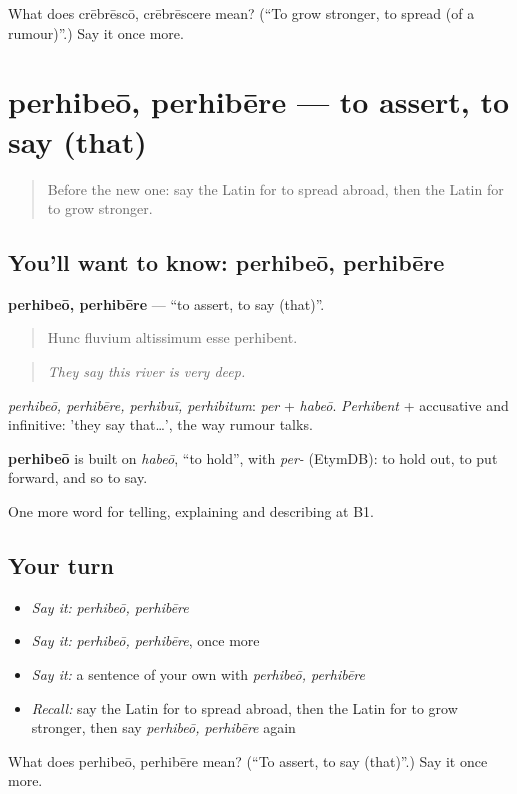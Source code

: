 \begin{tcolorbox}[breakable,colback=teal!4,colframe=teal!35!black,title={Before you move on}]
What does crēbrēscō, crēbrēscere mean? (\textquotedblleft{}To grow stronger, to spread (of a rumour)\textquotedblright{}.) Say it once more.
\end{tcolorbox}
\section[perhibeō, perhibēre]{perhibeō, perhibēre — to assert, to say (that)}

\label{lesson:LA-C301-perhibeo}



\begin{quote}
Before the new one: say the Latin for to spread abroad, then the Latin for to grow stronger.
\end{quote}

\subsection*{You'll want to know: perhibeō, perhibēre}
\textbf{perhibeō, perhibēre} — \textquotedblleft{}to assert, to say (that)\textquotedblright{}.

\begin{quote}
Hunc fluvium altissimum esse perhibent.
\end{quote}

\begin{quote}
\emph{They say this river is very deep.}
\end{quote}

\emph{perhibeō, perhibēre, perhibuī, perhibitum}: \emph{per} + \emph{habeō}. \emph{Perhibent} + accusative and infinitive: 'they say that…', the way rumour talks.

\begin{cousinweb}
\textbf{perhibeō} is built on \emph{habeō}, \textquotedblleft{}to hold\textquotedblright{}, with \emph{per-} (EtymDB): to hold out, to put forward, and so to say.
\end{cousinweb}

\begin{grammarlens}[title={What you've built}]
One more word for telling, explaining and describing at B1.
\end{grammarlens}

\subsection*{Your turn}
\begin{itemize}
\raggedright
  \item \emph{Say it:} \emph{perhibeō, perhibēre}
  \item \emph{Say it:} \emph{perhibeō, perhibēre}, once more
  \item \emph{Say it:} a sentence of your own with \emph{perhibeō, perhibēre}
  \item \emph{Recall:} say the Latin for to spread abroad, then the Latin for to grow stronger, then say \emph{perhibeō, perhibēre} again
\end{itemize}

\begin{tcolorbox}[breakable,colback=teal!4,colframe=teal!35!black,title={Before you move on}]
What does perhibeō, perhibēre mean? (\textquotedblleft{}To assert, to say (that)\textquotedblright{}.) Say it once more.
\end{tcolorbox}

